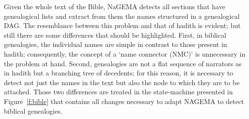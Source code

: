 \documentclass{llncs}
\begin{document}
\begin{figure}[tb]
\end{figure}

Given the whole text of the Bible, NaGEMA detects all sections that have genealogical lists
and extract from them the names structured in a genealogical DAG. The resemblance between this problem and that of hadith is evident; 
but still there are some differences that should be highlighted. 
First, in biblical genealogies, the individual names are simple in contrast to those present in hadith; 
consequently, the concept of a `name connector (NMC)' is unnecessary in the problem at hand.
Second, genealogies are not a flat sequence of narrators as in hadith but a branching tree of decedents; 
for this reason, it is necessary to detect not just the names in the text but also the node to which they are to be attached.
Those two differences are treated in the state-machine presented in Figure~\ref{f:bible} that contains all changes necessary to adapt NAGEMA to detect 
biblical genealogies.
\end{document}
